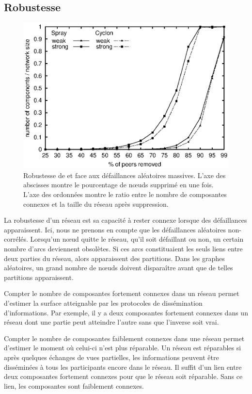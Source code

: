 \subsection{Robustesse}
\label{net:subsec:robustness}

\begin{figure}
  \centering
  \includegraphics[width=.8\textwidth]{img/spray/resilience.eps}
  \caption{\label{net:fig:robustness} Robustesse de \CYCLON et \SPRAY face aux
    défaillances aléatoires massives. L'axe des abscisses montre le pourcentage
    de nœuds supprimé en une fois. L'axe des ordonnées montre le ratio entre le
    nombre de composantes connexes et la taille du réseau après suppression.}
\end{figure}

La robustesse d'un réseau est sa capacité à rester connexe lorsque des
défaillances apparaissent. Ici, nous ne prenons en compte que les défaillances
aléatoires non-corrélés. Lorsqu'un nœud quitte le réseau, qu'il soit défaillant
ou non, un certain nombre d'arcs deviennent obsolètes. Si ces arcs constituaient
les seuls liens entre deux parties du réseau, alors apparaissent des partitions.
Dans les graphes aléatoires, un grand nombre de nœuds doivent disparaître avant
que de telles partitions apparaissent.

Compter le nombre de composantes fortement connexes dans un réseau permet
d'estimer la surface atteignable par les protocoles de dissémination
d'informations. Par exemple, il y a deux composantes fortement connexes dans un
réseau dont une partie peut atteindre l'autre sans que l'inverse soit
vrai.

Compter le nombre de composantes faiblement connexes dans une réseau permet
d'estimer le moment où celui-ci n'est plus réparable. Un réseau est réparables
si après quelques échanges de vues partielles, les informations peuvent être
disséminées à tous les participants encore dans le réseau. Il suffit d'un lien
entre deux composantes fortement connexes pour que le réseau soit
réparable. Sans ce lien, les composantes sont faiblement connexes.

